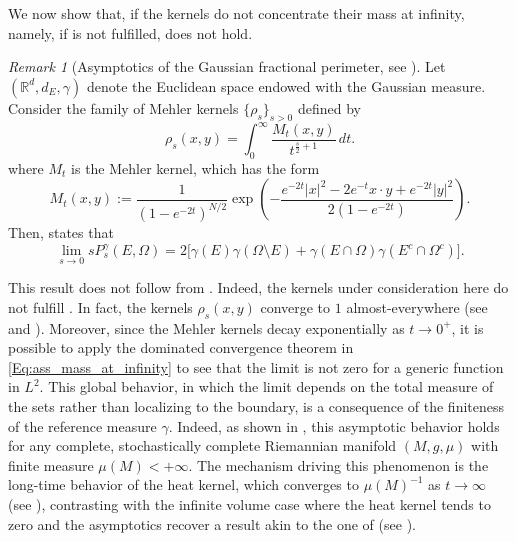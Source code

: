 \documentclass[reqno,11pt]{amsart}
\numberwithin{equation}{section}
\theoremstyle{definition} %
\theoremstyle{plain}
\theoremstyle{definition}
\theoremstyle{remark}
\newtheorem{remark}[remark]{Remark}
\begin{document}
We now show that, if the kernels do not concentrate their mass at infinity, namely, if   is not fulfilled,  does not hold.\\
\color{magenta}
\normalcolor
\begin{remark}[Asymptotics of the Gaussian fractional perimeter, see \cite{GaussianFracPer}]
\label{Remark:GaussPer}
    Let $(\mathbb{R}^d, d_E, \gamma)$ denote the Euclidean space endowed with the Gaussian measure. Consider the family of Mehler kernels $\{\rho_s\}_{s>0}$ defined by
    \begin{equation}\label{MehlerKernels}
                \rho_s(x,y) = \int_0^\infty \frac{M_t(x,y)}{t^{\frac{s}{2}+1}} \, dt.
    \end{equation}
    where $M_t$ is the Mehler kernel, which has the form
    \[M_t(x,y)
:=
\frac{1}{(1 - e^{-2t})^{N/2}}
\exp\!\left(
-\frac{e^{-2t}\lvert x\rvert^2 - 2e^{-t} x\cdot y + e^{-2t}\lvert y\rvert^2}
{2(1 - e^{-2t})}
\right).
\]
Then, \cite[Main Theorem]{GaussianFracPer} states that
\[
    \lim_{s\to 0} s P^\gamma_s(E, \Omega) = 2 \big[ \gamma(E)\gamma(\Omega\setminus E) + \gamma(E\cap\Omega)\gamma(E^c\cap\Omega^c) \big].
\]

This result does not follow from . Indeed, the kernels under consideration here do not fulfill . In fact, the kernels $\rho_s(x,y)$ converge to $1$ almost-everywhere (see \cite[Lemma 2.6]{CaselliGennaioli} and \cite[Section 4.3]{CaselliGennaioli}). Moreover, since the Mehler kernels decay exponentially as $t\to0^+$, it is possible to apply the dominated convergence theorem in \ref{Eq:ass_mass_at_infinity} to see that the limit is not zero for a generic function in $L^2$. This global behavior, in which the limit depends on the total measure of the sets rather than localizing to the boundary, is a consequence of the finiteness of the reference measure $\gamma$.
Indeed, as shown in \cite[Theorem 1.8]{CaselliGennaioli}, this asymptotic behavior holds for any complete, stochastically complete Riemannian manifold $(M,g,\mu)$ with finite measure $\mu(M)<+\infty$.
The mechanism driving this phenomenon is the long-time behavior of the heat kernel, which converges to $\mu(M)^{-1}$ as $t \to \infty$ (see \cite[Lemma 2.6]{CaselliGennaioli}), contrasting with the infinite volume case where the heat kernel tends to zero and the asymptotics recover a result akin to the one of \cite{Quartet} (see \cite[Theorem 1.6]{CaselliGennaioli}). 
\end{remark}
\end{document}
